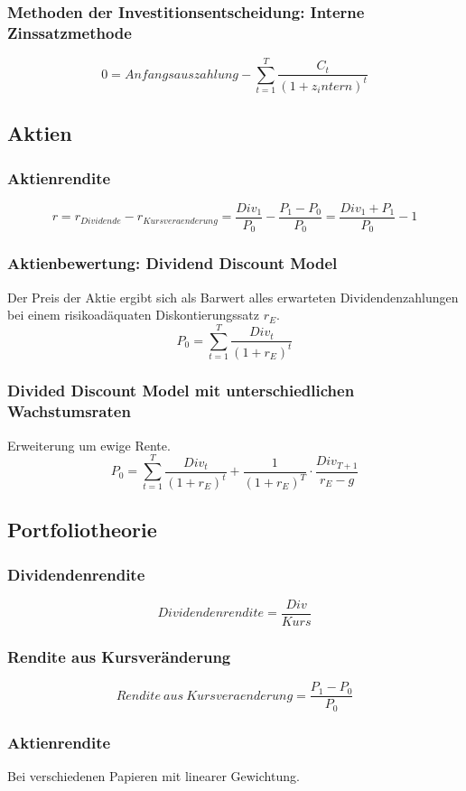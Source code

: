 \subsubsection{Methoden der Investitionsentscheidung: Interne Zinssatzmethode}
\[0 = Anfangsauszahlung - \sum_{t=1}^{T}\frac{C_t}{(1+z_intern)^t}\]


\subsection{Aktien}

\subsubsection{Aktienrendite}
\[r = r_{Dividende}-r_{Kursveraenderung} = \frac{Div_1}{P_0}-\frac{P_1-P_0}{P_0} = \frac{Div_1+P_1}{P_0} - 1\]

\subsubsection{Aktienbewertung: Dividend Discount Model}
Der Preis der Aktie ergibt sich als Barwert alles erwarteten Dividendenzahlungen bei einem risikoadäquaten Diskontierungssatz \(r_E\).
\[P_0 = \sum_{t=1}^T \frac{Div_t}{(1+r_E)^t}\]

\subsubsection{Divided Discount Model mit unterschiedlichen Wachstumsraten}
Erweiterung um ewige Rente.
\[P_0 = \sum_{t=1}^{T} \frac{Div_t}{(1+r_E)^t} + \frac{1}{(1+r_E)^T}\cdot\frac{Div_{T+1}}{r_E-g}\]


\subsection{Portfoliotheorie}

\subsubsection{Dividendenrendite}
\[Dividendenrendite = \frac{Div}{Kurs}\]

\subsubsection{Rendite aus Kursveränderung}
\[Rendite~aus~Kursveraenderung = \frac{P_1-P_0}{P_0}\]

\subsubsection{Aktienrendite}
Bei verschiedenen Papieren mit linearer Gewichtung.

